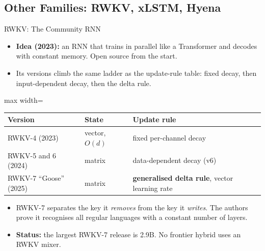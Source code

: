 \subsection{Other Families: RWKV, xLSTM, Hyena}

\begin{frame}{RWKV: The Community RNN}
    \begin{itemize}\itemsep0.5em
        \item \textbf{Idea (2023):} an RNN that trains in parallel like a Transformer and decodes with constant memory. Open source from the start.
        \item Its versions climb the same ladder as the update-rule table: fixed decay, then input-dependent decay, then the delta rule.
    \end{itemize}
    \vspace{0.2em}
    \begin{center}
    \small
    \begin{adjustbox}{max width=\linewidth}\begin{tabular}{lll}
        \toprule
        \textbf{Version} & \textbf{State} & \textbf{Update rule} \\
        \midrule
        RWKV-4 (2023) & vector, $O(d)$ & fixed per-channel decay \\
        RWKV-5 and 6 (2024) & matrix & data-dependent decay (v6) \\
        \rowcolor{KAUSTcyan!12} RWKV-7 ``Goose'' (2025) & matrix & \textbf{generalised delta rule}, vector learning rate \\
        \bottomrule
    \end{tabular}\end{adjustbox}
    \end{center}
    \vspace{0.2em}
    \begin{itemize}\itemsep0.5em
        \item RWKV-7 separates the key it \emph{removes} from the key it \emph{writes}. The authors prove it recognises all regular languages with a constant number of layers.
        \item \textbf{Status:} the largest RWKV-7 release is 2.9B. No frontier hybrid uses an RWKV mixer.
    \end{itemize}
\end{frame}

